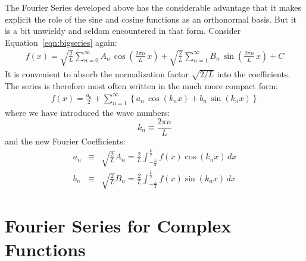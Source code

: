 \documentclass[12pt]{article}
\begin{document}
The Fourier Series developed above has the considerable advantage that it makes explicit the role of the sine and cosine functions as an orthonormal basis.  But it is a bit unwieldy and seldom encountered in that form.  Consider Equation~\ref{eqn:bigseries} again:
\begin{eqnarray*}
f(x) = \sqrt{\frac{2}{L}} \sum_{n=0}^{\infty}  A_n \, \cos\left(\frac{2\pi n}{L} \, x \right) + \sqrt{\frac{2}{L}} \sum_{n=1}^{\infty} B_n \, \sin\left(\frac{2\pi n}{L} \, x \right) + C
\end{eqnarray*}
It is convenient to absorb the normalization factor $\sqrt{2/L}$ into the coefficients.  The series is therefore most often written in the much more compact form:
\begin{eqnarray}
f(x) = \frac{a_0}{2} + \sum_{n=1}^{\infty}  \left\{ a_n \, \cos(k_n x ) + b_n \, \sin( k_n x ) \right\}\label{eqn:convseries}
\end{eqnarray}
where we have introduced the wave numbers:
\begin{equation}
k_n \equiv \frac{2 \pi n}{L} \label{eqn:kn}
\end{equation}
and the new Fourier Coefficients:
\begin{eqnarray}
a_n &\equiv& \sqrt{\frac{2}{L}}  A_n = \frac{2}{L} \int_{-\frac{L}{2}}^{\frac{L}{2}} 
f(x) \cos( k_n x) \, dx  \label{eqn:convcoeffa}\\
b_n &\equiv& \sqrt{\frac{2}{L}}  B_n = \frac{2}{L} \int_{-\frac{L}{2}}^{\frac{L}{2}} 
f(x) \sin( k_n x) \, dx \label{eqn:convcoeffb}
\end{eqnarray}

\section{Fourier Series for Complex Functions}
\end{document}
